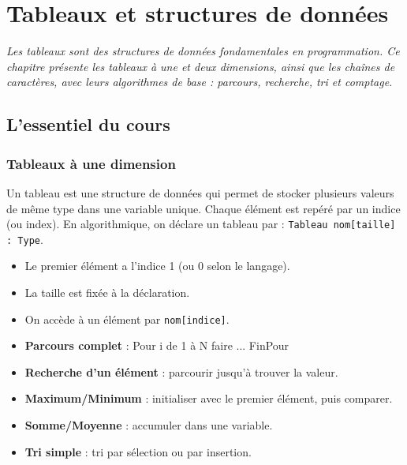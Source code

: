 \chapter{Tableaux et structures de données}

\textit{Les tableaux sont des structures de données fondamentales en programmation. Ce chapitre présente les tableaux à une et deux dimensions, ainsi que les chaînes de caractères, avec leurs algorithmes de base : parcours, recherche, tri et comptage.}

\section{L'essentiel du cours}

\subsection{Tableaux à une dimension}

\begin{definition}[Tableau]
Un tableau est une structure de données qui permet de stocker plusieurs valeurs de même type dans une variable unique. Chaque élément est repéré par un indice (ou index). En algorithmique, on déclare un tableau par : \texttt{Tableau nom[taille] : Type}.
\end{definition}

\begin{propriete}
\begin{itemize}
    \item Le premier élément a l'indice 1 (ou 0 selon le langage).
    \item La taille est fixée à la déclaration.
    \item On accède à un élément par \texttt{nom[indice]}.
\end{itemize}
\end{propriete}

\begin{aretenir}
\begin{itemize}
    \item \textbf{Parcours complet} : Pour i de 1 à N faire ... FinPour
    \item \textbf{Recherche d'un élément} : parcourir jusqu'à trouver la valeur.
    \item \textbf{Maximum/Minimum} : initialiser avec le premier élément, puis comparer.
    \item \textbf{Somme/Moyenne} : accumuler dans une variable.
    \item \textbf{Tri simple} : tri par sélection ou par insertion.
\end{itemize}
\end{aretenir}

